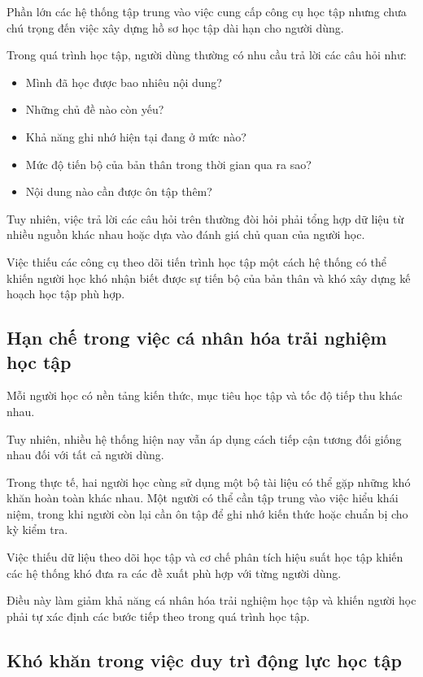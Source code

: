 Phần lớn các hệ thống tập trung vào việc cung cấp công cụ học tập nhưng chưa chú trọng đến việc xây dựng hồ sơ học tập dài hạn cho người dùng.

Trong quá trình học tập, người dùng thường có nhu cầu trả lời các câu hỏi như:
\begin{itemize}
    \item Mình đã học được bao nhiêu nội dung?
    \item Những chủ đề nào còn yếu?
    \item Khả năng ghi nhớ hiện tại đang ở mức nào?
    \item Mức độ tiến bộ của bản thân trong thời gian qua ra sao?
    \item Nội dung nào cần được ôn tập thêm?
\end{itemize}

Tuy nhiên, việc trả lời các câu hỏi trên thường đòi hỏi phải tổng hợp dữ liệu từ nhiều nguồn khác nhau hoặc dựa vào đánh giá chủ quan của người học.

Việc thiếu các công cụ theo dõi tiến trình học tập một cách hệ thống có thể khiến người học khó nhận biết được sự tiến bộ của bản thân và khó xây dựng kế hoạch học tập phù hợp.

\subsection{Hạn chế trong việc cá nhân hóa trải nghiệm học tập}

Mỗi người học có nền tảng kiến thức, mục tiêu học tập và tốc độ tiếp thu khác nhau.

Tuy nhiên, nhiều hệ thống hiện nay vẫn áp dụng cách tiếp cận tương đối giống nhau đối với tất cả người dùng.

Trong thực tế, hai người học cùng sử dụng một bộ tài liệu có thể gặp những khó khăn hoàn toàn khác nhau. Một người có thể cần tập trung vào việc hiểu khái niệm, trong khi người còn lại cần ôn tập để ghi nhớ kiến thức hoặc chuẩn bị cho kỳ kiểm tra.

Việc thiếu dữ liệu theo dõi học tập và cơ chế phân tích hiệu suất học tập khiến các hệ thống khó đưa ra các đề xuất phù hợp với từng người dùng.

Điều này làm giảm khả năng cá nhân hóa trải nghiệm học tập và khiến người học phải tự xác định các bước tiếp theo trong quá trình học tập.

\subsection{Khó khăn trong việc duy trì động lực học tập}

